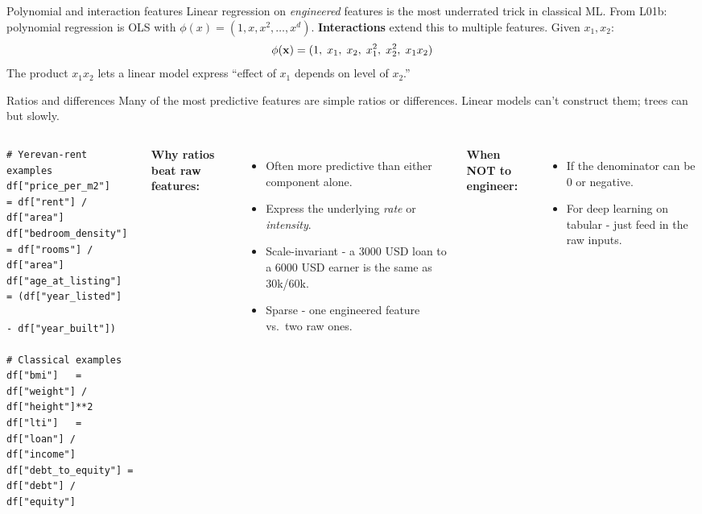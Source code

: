\documentclass[aspectratio=169]{beamer}
\begin{document}
\begin{frame}{Polynomial and interaction features}
  Linear regression on \emph{engineered} features is the most underrated trick in classical ML. From L01b: polynomial regression is OLS with $\phi(x) = (1, x, x^2, \ldots, x^d)$.
  \vfill
  \textbf{Interactions} extend this to multiple features. Given $x_1, x_2$:
  \[
    \phi(\mathbf{x}) = (1,\; x_1,\; x_2,\; x_1^2,\; x_2^2,\; x_1 x_2)
  \]
  The product $x_1 x_2$ lets a linear model express ``effect of $x_1$ depends on level of $x_2$.''
  \vfill
\end{frame}

\begin{frame}[fragile]{Ratios and differences}
  Many of the most predictive features are simple ratios or differences. Linear models can't construct them; trees can but slowly.
  \vfill
  \begin{columns}[T]
{\lstset{basicstyle=\ttfamily\scriptsize}
\begin{lstlisting}
# Yerevan-rent examples
df["price_per_m2"]    = df["rent"] / df["area"]
df["bedroom_density"] = df["rooms"] / df["area"]
df["age_at_listing"]  = (df["year_listed"]
                         - df["year_built"])

# Classical examples
df["bmi"]   = df["weight"] / df["height"]**2
df["lti"]   = df["loan"] / df["income"]
df["debt_to_equity"] = df["debt"] / df["equity"]
\end{lstlisting}}
    \footnotesize
    \textbf{Why ratios beat raw features:}
    \begin{itemize}\footnotesize
      \item Often more predictive than either component alone.
      \item Express the underlying \emph{rate} or \emph{intensity}.
      \item Scale-invariant - a 3000 USD loan to a 6000 USD earner is the same as 30k/60k.
      \item Sparse - one engineered feature vs.\ two raw ones.
    \end{itemize}
    \textbf{When NOT to engineer:}
    \begin{itemize}\footnotesize
      \item If the denominator can be 0 or negative.
      \item For deep learning on tabular - just feed in the raw inputs.
    \end{itemize}
  \end{columns}
\end{frame}
\end{document}
